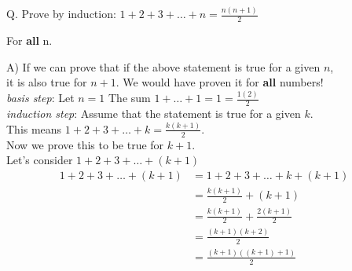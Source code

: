 \documentclass{article}
\newcounter{question}
\begin{document}
\newcommand\Que[1]{%
    \leavevmode\par
    \stepcounter{question}
    \noindent
    Q.\thequestion #1\par}

\newcommand\Ans[2][]{%
    \leavevmode\par\noindent
    {A) \textbf{#1}#2\par}}

\Que{
    Prove by induction: $1+2+3+\dots+n = \frac{n(n+1)}{2}$

    For \textbf{all} n.
}
\Ans{
    If we can prove that if the above statement is true for 
    a given $n$,\\
    it is also true for $n+1$. We would have
    proven it for \textbf{all} numbers!\\

    \textit{basis step}: Let $n=1$ The sum $1+\dots+1 = 1 = \frac{1(2)}{2}$\\

    \textit{induction step}: Assume that the statement is
    true for a given $k$.\\
    This means $1+2+3+\dots+k=\frac{k(k+1)}{2}$.\\
    Now we prove this to be true for $k+1$.\\

    Let's consider $1+2+3+\dots+(k+1)$\\

    \begin{align*}
        1+2+3+\dots+(k+1) 
        & = 1+2+3+\dots+k+(k+1)\\
        & = \frac{k(k+1)}{2} + (k+1)\\
        & = \frac{k(k+1)}{2} + \frac{2(k+1)}{2}\\
        & = \frac{(k+1)(k+2)}{2}\\
        & = \frac{(k+1)((k+1)+1)}{2}\\
    \end{align*}

}
\end{document}
